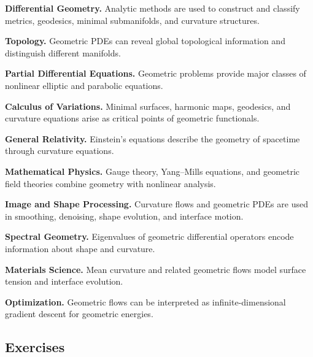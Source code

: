 \begin{applicationbox}
\textbf{Differential Geometry.}
Analytic methods are used to construct and classify metrics, geodesics,
minimal submanifolds, and curvature structures.

\medskip

\textbf{Topology.}
Geometric PDEs can reveal global topological information and distinguish
different manifolds.

\medskip

\textbf{Partial Differential Equations.}
Geometric problems provide major classes of nonlinear elliptic and
parabolic equations.

\medskip

\textbf{Calculus of Variations.}
Minimal surfaces, harmonic maps, geodesics, and curvature equations arise
as critical points of geometric functionals.

\medskip

\textbf{General Relativity.}
Einstein's equations describe the geometry of spacetime through
curvature equations.

\medskip

\textbf{Mathematical Physics.}
Gauge theory, Yang--Mills equations, and geometric field theories combine
geometry with nonlinear analysis.

\medskip

\textbf{Image and Shape Processing.}
Curvature flows and geometric PDEs are used in smoothing, denoising,
shape evolution, and interface motion.

\medskip

\textbf{Spectral Geometry.}
Eigenvalues of geometric differential operators encode information about
shape and curvature.

\medskip

\textbf{Materials Science.}
Mean curvature and related geometric flows model surface tension and
interface evolution.

\medskip

\textbf{Optimization.}
Geometric flows can be interpreted as infinite-dimensional gradient
descent for geometric energies.
\end{applicationbox}

\subsection{Exercises}
\label{subsec:geometric-analysis-exercises}

